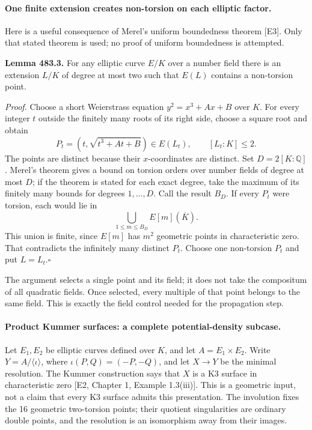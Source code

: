 \documentclass[11pt]{article}
\begin{document}
\paragraph{One finite extension creates non-torsion on each elliptic factor.}
Here is a useful consequence of Merel's uniform boundedness theorem [E3].
Only that stated theorem is used; no proof of uniform boundedness is
attempted.

\textbf{Lemma 483.3.}
For any elliptic curve $E/K$ over a number field there is an extension
$L/K$ of degree at most two such that $E(L)$ contains a non-torsion point.

\emph{Proof.}
Choose a short Weierstrass equation $y^2=x^3+Ax+B$ over $K$.
For every integer $t$ outside the finitely many roots of its right side,
choose a square root and obtain
\[
 P_t=(t,\sqrt{t^3+At+B})\in E(L_t),\qquad [L_t:K]\le2.
\]
The points are distinct because their $x$-coordinates are distinct.
Set $D=2[K:\mathbb Q]$. Merel's theorem gives a bound on torsion orders
over number fields of degree at most $D$; if the theorem is stated for
each exact degree, take the maximum of its finitely many bounds for
degrees $1,\ldots,D$. Call the result $B_D$.
If every $P_t$ were torsion, each would lie in
\[
 \bigcup_{1\le m\le B_D}E[m](\overline K).
\]
This union is finite, since $E[m]$ has $m^2$ geometric points in
characteristic zero. That contradicts the infinitely many distinct
$P_t$. Choose one non-torsion $P_t$ and put $L=L_t$.\hfill$\square$

The argument selects a single point and its field; it does not take the
compositum of all quadratic fields. Once selected, every multiple of that
point belongs to the same field. This is exactly the field control needed
for the propagation step.

\paragraph{Product Kummer surfaces: a complete potential-density subcase.}
Let $E_1,E_2$ be elliptic curves defined over $K$, and let
$A=E_1\times E_2$. Write $Y=A/\langle\iota\rangle$, where
$\iota(P,Q)=(-P,-Q)$, and let $X\to Y$ be the minimal resolution.
The Kummer construction says that $X$ is a K3 surface in characteristic
zero [E2, Chapter 1, Example 1.3(iii)]. This is a geometric input, not a
claim that every K3 surface admits this presentation. The involution fixes
the 16 geometric two-torsion points; their quotient singularities are
ordinary double points, and the resolution is an isomorphism away from
their images.
\end{document}
